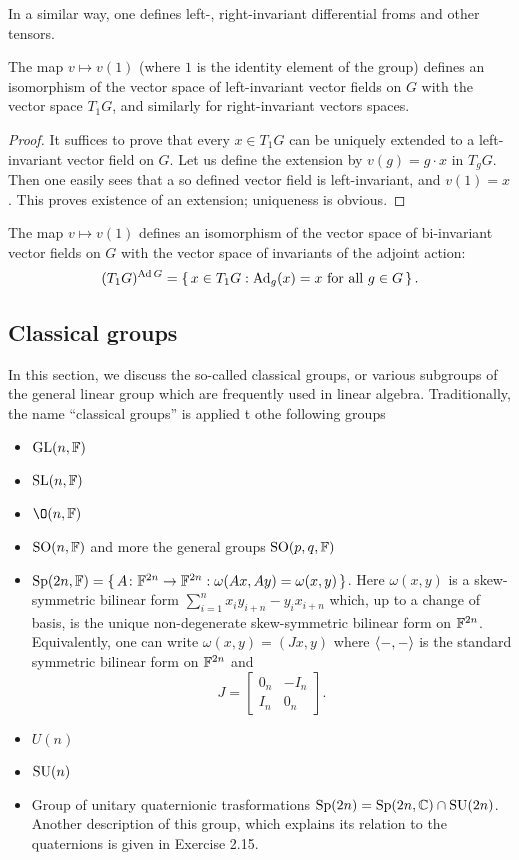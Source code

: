 In a similar way, one defines left-, right-invariant differential froms and
other tensors.

\begin{theorem}
  The map $v\mapsto v(1)$ (where $1$ is the identity element of the
  group) defines an isomorphism of the vector space of left-invariant
  vector fields on $G$ with the vector space $T_1G$, and similarly for
  right-invariant vectors spaces.
\end{theorem}

\begin{proof}
  It suffices to prove that every $x\in T_1G$ can be uniquely extended to a
  left-invariant vector field on $G$. Let us define the extension by
  $v(g)=g\cdot x$ in $T_gG$. Then one easily sees that a so defined
  vector field is left-invariant, and $v(1)=x$. This proves existence of
  an extension; uniqueness is obvious.
\end{proof}

\begin{theorem}
  The map $v\mapsto v(1)$ defines an isomorphism of the vector space
  of bi-invariant vector fields on $G$ with the vector space of invariants
  of the adjoint action:
  \[
    (T_1G)^{\operatorname{Ad} G}=\left\{\,x\in T_1G:\text{$\operatorname{Ad}_g(x)=x$ for all
        $g\in G$}\,\right\}.
  \]
\end{theorem}

\subsection{Classical groups}
In this section, we discuss the so-called classical groups, or various
subgroups of the general linear group which are frequently used in linear
algebra. Traditionally, the name ``classical groups'' is applied t othe
following groups
\begin{itemize}
\item $\mathrm{GL}(n,\mathbb{F})$
\item $\mathrm{SL}(n,\mathbb{F})$
\item $\O(n,\bbF)$
\item $\mathrm{SO}(n,\mathbb{F})$ and more the general groups $\mathrm{SO}(p,q,\mathbb{F})$
\item
  $\mathrm{Sp}(2n,\mathbb{F})=\{\,A\colon\mathbb{F}^{2n}\to\mathbb{F}^{2n}:\omega(Ax,Ay)=\omega(x,y)\,\}$. Here
  $\omega(x,y)$ is a skew-symmetric bilinear form
  $\sum_{i=1}^n x_iy_{i+n}-y_ix_{i+n}$ which, up to a change of basis, is
  the unique non-degenerate skew-symmetric bilinear form on
  $\mathbb{F}^{2n}$. Equivalently, one can write $\omega(x,y)=(Jx,y)$
  where $\langle {-},{-} \rangle$ is the standard symmetric bilinear
  form on $\mathbb{F}^{2n}$ and
  \[
    J=
    \begin{bmatrix}
      0_n&-I_n\\
      I_n&0_n
    \end{bmatrix}.
  \]
\item $U(n)$
\item $\mathrm{SU}(n)$
\item Group of unitary quaternionic trasformations
  $\mathrm{Sp}(2n)=\mathrm{Sp}(2n,\mathbb{C})\cap\mathrm{SU}(2n)$. Another description of this group,
  which explains its relation to the quaternions is given in Exercise
  2.15.
\end{itemize}

